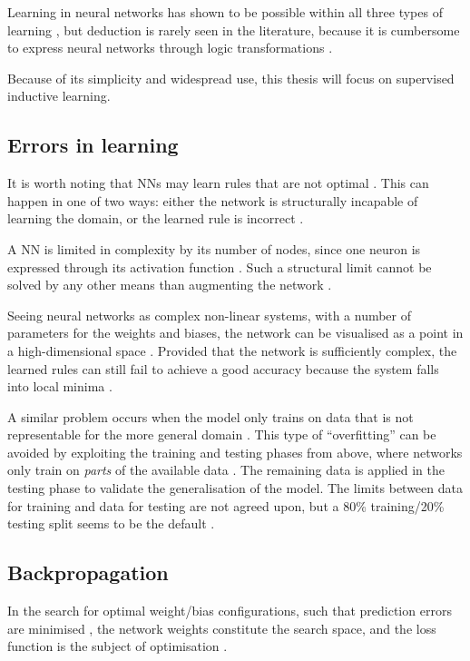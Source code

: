 \documentclass[report.tex]{subfiles}
\begin{document}
Learning in neural networks has shown to be possible within all three
types of learning \cite{Schmidhuber2014, Russel2007}, but deduction is rarely
seen in the literature, because it is cumbersome to express neural
networks through logic transformations \cite{Pearl2018}.

Because of its simplicity and widespread use, this thesis will focus on supervised
inductive learning.

\subsection{Errors in learning}
It is worth noting that \gls{NN}s may learn 
rules that are not optimal \cite{Russel2007}.
This can happen in one of two ways: either the
network is structurally incapable of learning the domain, 
or the learned rule is incorrect \cite{Russel2007, Eliasmith2015}.

A \gls{NN} is limited in complexity by its number of nodes,
since one neuron is expressed through its activation function
\cite{Dayan2001, Russel2007}.
Such a structural limit cannot be solved by any other means
than augmenting the network \cite{Russel2007}.

Seeing neural networks as complex non-linear systems, with
a number of parameters for the weights and biases,
the network can be visualised as a point in a high-dimensional space 
\cite{Russel2007}. 
Provided that the network is sufficiently complex, the 
learned rules can still fail to achieve a good accuracy because
the system falls into local minima \cite{Russel2007}.

A similar problem occurs when the model only trains on data
that is not representable for the more general domain \cite{Russel2007}.
This type of ``overfitting'' can be avoided by exploiting the 
training and testing phases from above, where networks
only train on \textit{parts} of the available data
\cite{Russel2007, Schmidhuber2014}.
The remaining data is applied in the testing phase to
validate the generalisation of the model.
The limits between data for training and data for testing
are not agreed upon, but a 80\% training/20\% testing split seems to be
the default \cite{Russel2007, Schmidhuber2014}.

\subsection{Backpropagation}
In the search for optimal weight/bias configurations,
such that prediction errors are minimised \cite{Rumelhart1988},
the network weights constitute the search space, 
and the loss function
is the subject of optimisation \cite{Russel2007}.
\end{document}
